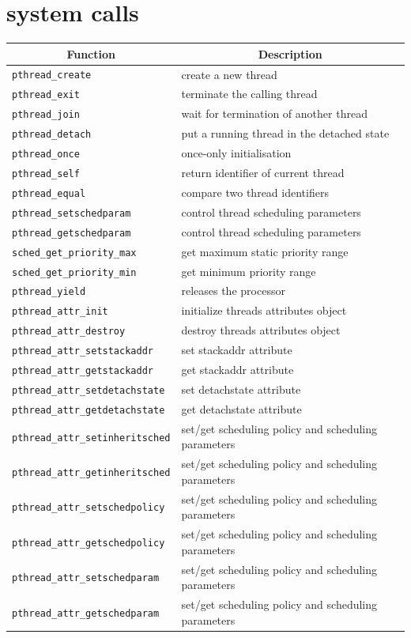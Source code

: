 \documentclass[a4paper,10pt,twoside]{report}
\begin{document}
\chapter{system calls}\label{parsyscall}
\begin{longtable}{|l|l|}\hline 
\multicolumn{1}{|c|}{Function} & \multicolumn{1}{c|}{Description} \\ \hline
\endhead
\texttt{pthread\_create} & create a new thread\\
\texttt{pthread\_exit} & terminate the calling thread\\
\texttt{pthread\_join} & wait for termination of another thread\\
\texttt{pthread\_detach} & put a running thread in the detached state\\
\texttt{pthread\_once} & once-only initialisation \\
\texttt{pthread\_self} & return identifier of current thread\\
\texttt{pthread\_equal} & compare two thread identifiers\\ \hline

\texttt{pthread\_setschedparam} & control thread scheduling parameters\\
\texttt{pthread\_getschedparam} & control thread scheduling parameters\\ \hline
\texttt{sched\_get\_priority\_max} & get maximum static priority range \\
\texttt{sched\_get\_priority\_min} & get minimum priority range\\
\texttt{pthread\_yield} & releases the processor\\ \hline


\texttt{pthread\_attr\_init} & initialize threads attributes object\\
\texttt{pthread\_attr\_destroy} & destroy threads attributes object\\
\texttt{pthread\_attr\_setstackaddr} & set stackaddr attribute \\
\texttt{pthread\_attr\_getstackaddr} & get  stackaddr attribute\\
\texttt{pthread\_attr\_setdetachstate} & set detachstate attribute  \\
\texttt{pthread\_attr\_getdetachstate} &  get  detachstate attribute \\
\texttt{pthread\_attr\_setinheritsched} & set/get scheduling policy and scheduling parameters \\
\texttt{pthread\_attr\_getinheritsched} & set/get scheduling policy and scheduling parameters \\
\texttt{pthread\_attr\_setschedpolicy} &set/get scheduling policy and scheduling parameters \\
\texttt{pthread\_attr\_getschedpolicy} & set/get scheduling policy and scheduling parameters\\
\texttt{pthread\_attr\_setschedparam} & set/get scheduling policy and scheduling parameters\\
\texttt{pthread\_attr\_getschedparam} & set/get scheduling policy and scheduling parameters\\ \hline


\end{longtable}
\end{document}

